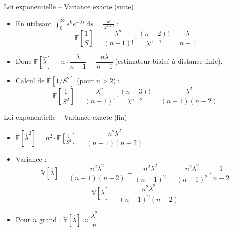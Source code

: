 \documentclass[11pt,aspectratio=169]{beamer}
\newcommand{\dd}{\mathrm{d}}
\begin{document}
\begin{frame}{Loi exponentielle -- Variance exacte (suite)}

\begin{itemize}

\item En utilisant $\displaystyle \int_0^\infty s^{k} e^{-\lambda s} \, \dd s = \frac{k!}{\lambda^{k+1}}$ :
  \[
  \mathbb{E}\left[\frac{1}{S}\right] = \frac{\lambda^n}{(n-1)!} \cdot \frac{(n-2)!}{\lambda^{n-1}} = \frac{\lambda}{n-1}
  \]

\item Donc $\mathbb{E}[\hat{\lambda}] = n \cdot \dfrac{\lambda}{n-1} = \dfrac{n\lambda}{n-1}$ (estimateur biaisé à distance finie).\newline

\item Calcul de $\mathbb{E}[1/S^2]$ (pour $n > 2$) :
  \[
  \mathbb{E}\left[\frac{1}{S^2}\right] = \frac{\lambda^n}{(n-1)!} \cdot \frac{(n-3)!}{\lambda^{n-2}} = \frac{\lambda^2}{(n-1)(n-2)}
  \]

\end{itemize}

\end{frame}

\begin{frame}{Loi exponentielle -- Variance exacte (fin)}

\begin{itemize}

\item $\mathbb{E}[\hat{\lambda}^2] = n^2 \cdot \mathbb{E}\left[\frac{1}{S^2}\right] = \dfrac{n^2 \lambda^2}{(n-1)(n-2)}$\newline

\item Variance :
  \[
  \mathbb{V}[\hat{\lambda}] = \frac{n^2\lambda^2}{(n-1)(n-2)} - \frac{n^2\lambda^2}{(n-1)^2} = \frac{n^2\lambda^2}{(n-1)^2} \cdot \frac{1}{n-2}
  \]
  \[
  \boxed{\mathbb{V}[\hat{\lambda}] = \frac{n^2 \lambda^2}{(n-1)^2(n-2)}}
  \]

\item Pour $n$ grand : $\mathbb{V}[\hat{\lambda}] \approx \dfrac{\lambda^2}{n}$

\end{itemize}

\end{frame}
\end{document}
